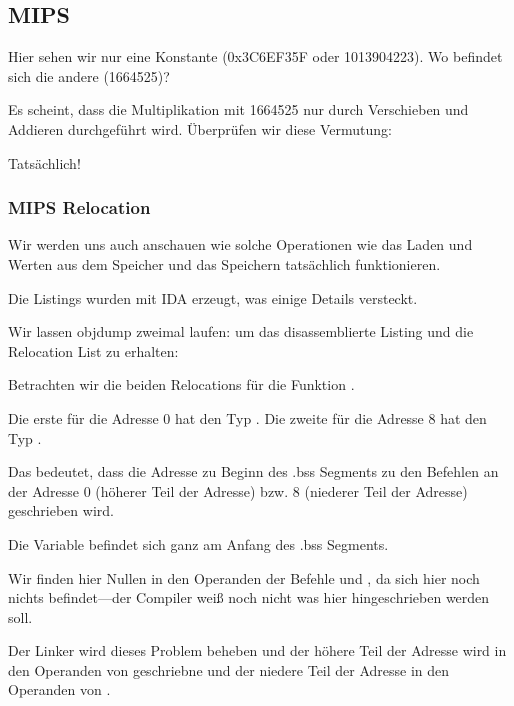 \subsection{MIPS}


Hier sehen wir nur eine Konstante (0x3C6EF35F oder 1013904223).
Wo befindet sich die andere (1664525)?

Es scheint, dass die Multiplikation mit 1664525 nur durch Verschieben und Addieren durchgeführt wird.
Überprüfen wir diese Vermutung:





Tatsächlich!

\subsubsection{MIPS Relocation}
Wir werden uns auch anschauen wie solche Operationen wie das Laden und Werten aus dem Speicher und das Speichern
tatsächlich funktionieren.

Die Listings wurden mit IDA erzeugt, was einige Details versteckt.

Wir lassen objdump zweimal laufen: um das disassemblierte Listing und die Relocation List zu erhalten:


Betrachten wir die beiden Relocations für die Funktion .

Die erste für die Adresse 0 hat den Typ .
Die zweite für die Adresse 8 hat den Typ .

Das bedeutet, dass die Adresse zu Beginn des .bss Segments zu den Befehlen an der Adresse 0 (höherer Teil der Adresse)
bzw. 8 (niederer Teil der Adresse) geschrieben wird.

Die Variable  befindet sich ganz am Anfang des .bss Segments.

Wir finden hier Nullen in den Operanden der Befehle \LUI und \SW, da sich hier noch nichts befindet---der Compiler weiß
noch nicht was hier hingeschrieben werden soll.

Der Linker wird dieses Problem beheben und der höhere Teil der Adresse wird in den Operanden von \LUI geschriebne und
der niedere Teil der Adresse in den Operanden von \SW.

